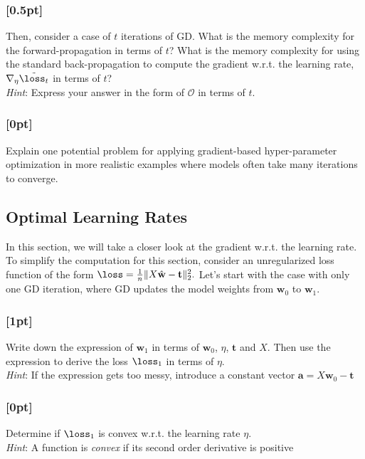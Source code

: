         \subsubsection{{\color{blue}[0.5pt]} \LI} 
        Then, consider a case of $t$ iterations of GD. What is the memory complexity for the forward-propagation in terms of $t$? What is the memory complexity for using the standard back-propagation to compute the gradient w.r.t. the learning rate, $\nabla_{\eta} \Tilde{\loss_t}$ in terms of $t$? \\
        \textit{Hint}: Express your answer in the form of $\mathcal{O}$ in terms of $t$.
        
        \subsubsection{[0pt] \LI}
        Explain one potential problem for applying gradient-based hyper-parameter optimization in more realistic examples where models often take many iterations to converge.
        
    \subsection{Optimal Learning Rates}
    In this section, we will take a closer look at the gradient w.r.t. the learning rate. To simplify the computation for this section, consider an unregularized loss function of the form $\loss = \frac{1}{n}\| X \hat{\mathbf{w}} - \mathbf{t} \|_2^2.$ Let's start with the case with only one GD iteration, where GD updates the model weights from $\mathbf{w}_0$ to $\mathbf{w}_1$. 
    
         \subsubsection{{\color{blue}[1pt]} \LII} 
        Write down the expression of $\mathbf{w}_1$ in terms of $\mathbf{w}_0$, $\eta$, $\mathbf{t}$ and $X$. Then use the expression to derive the loss $\loss_1$ in terms of $\eta$. \\
        {\it Hint}: If the expression gets too messy, introduce a constant vector $\mathbf{a} = X \mathbf{w}_0 - \mathbf{t}$
        
        \subsubsection{[0pt] \LIII}    
         Determine if $\loss_1$ is convex w.r.t. the learning rate $\eta$. \\
        {\it Hint}: A function is \textit{convex} if its second order derivative is positive
         
